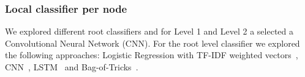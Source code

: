 \documentclass[11pt,a4paper]{article}
\begin{document}
\begin{comment}

In all the experiments we used the concatenation of the book's title + the blurb.

- sentence + word using NLTK's german algorithm or using a simple regular expression re.findall(r'(?u)\b\w\w+\b', text)
- lowercase or original case
- remove or not stopwords


We pre-processed the data by first tokenising the blurbs into sentences, and then
from sentences into tokens. We consider the title of the book a sentence. We used
the german sentence tokeniser, and the \textit {word\_punkt\_tokenizer} both available
on NLTLK 3.4.1~\cite{Bird:2009:NLP:1717171}, also, we only considered alphanumeric
tokens, i.e., all punctuation tokens were discarded.




\end{comment}




\subsubsection{Local classifier per node}

We explored different root classifiers and for Level 1 and Level 2 a
selected a Convolutional Neural Network (CNN). For the root level classifier we
explored the following approaches: Logistic Regression with TF-IDF weighted
vectors~\cite{}, CNN~\cite{kim-2014-convolutional},
LSTM~\cite{Hochreiter:1997:LSM:1246443.1246450} and
Bag-of-Tricks~\cite{joulin-etal-2017-bag}.
\end{document}
